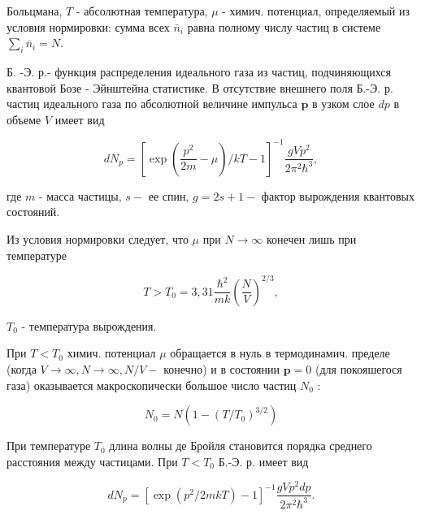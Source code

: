 \documentclass[10pt]{article}
\begin{document}
Больцмана, $T$ - абсолютная температура, $\mu$ - химич. потенциал, определяемый из условия нормировки: сумма всех $\bar{n}_{i}$ равна полному числу частиц в системе $\sum_{i} \bar{n}_{i}=N$.



Б. -Э. р.- функция распределения идеального газа из частиц, подчиняющихся квантовой Бозе - Эйнштейна статистике. В отсутствие внешнего поля Б.-Э. р. частиц идеального газа по абсолютной величине импульса $\boldsymbol{p}$ в узком слое $d p$ в объеме $V$ имеет вид



\[

d N_{p}=\left[\exp \left(\frac{p^{2}}{2 m}-\mu\right) / k T-1\right]^{-1} \frac{g V p^{2}}{2 \pi^{2} \hbar^{3}},

\]



где $m$ - масса частицы, $s-$ ее спин, $g=2 s+1-$ фактор вырождения квантовых состояний.



Из условия нормировки следует, что $\mu$ при $N \rightarrow \infty$ конечен лишь при температуре



\[

T>T_{0}=3,31 \frac{\hbar^{2}}{m k}\left(\frac{N}{V}\right)^{2 / 3},

\]



$T_{0}$ - температура вырождения.



При $T<T_{0}$ химич. потенциал $\mu$ обращается в нуль в термодинамич. пределе (когда $V \rightarrow \infty, N \rightarrow \infty, N / V-$ конечно) и в состоянии $\boldsymbol{p}=0$ (для покояшегося газа) оказывается макроскопически большое число частиц $N_{0}$ :



\[

N_{0}=N\left(1-\left(T / T_{0}\right)^{3 / 2}\right)

\]



При температуре $T_{0}$ длина волны де Бройля становится порядка среднего расстояния между частицами. При $T<T_{0}$ Б.-Э. р. имеет вид



\[

d N_{p}=\left[\exp \left(p^{2} / 2 m k T\right)-1\right]^{-1} \frac{g V p^{2} d p}{2 \pi^{2} \hbar^{3}} .

\]
\end{document}
